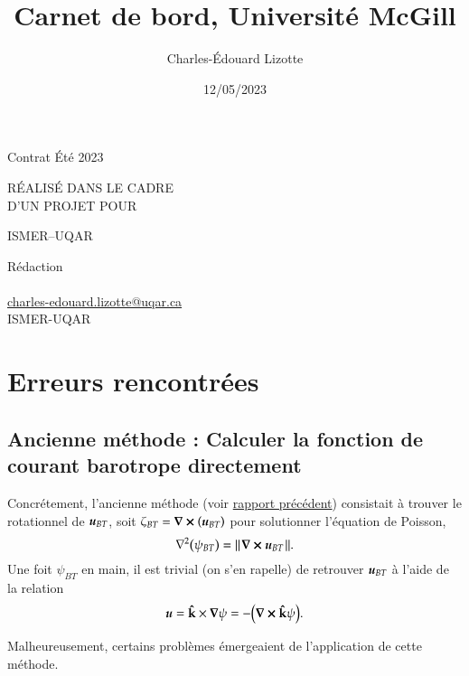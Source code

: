 \documentclass[10pt]{article}
\author{Charles-Édouard Lizotte}
\date{12/05/2023}
\title{Carnet de bord, Université McGill}
\makeatletter
\numberwithin{equation}{section}
\newcommand{\kvf}{\vb{\hat{k}}}
\newcommand{\uu}{\vb*{u}}
\newcommand{\pt}{\hspace{1pt}}
\newcommand{\mytitlepage}{
\begin{titlepage}
\begin{center}
{\Large Contrat Été 2023 \par}
\vspace{2cm}
{\Large \MakeUppercase{\thetitle} \par}
\vspace{2cm}
RÉALISÉ DANS LE CADRE\\ D'UN PROJET POUR \par
\vspace{2cm}
{\Large ISMER--UQAR \par}
\vspace{2cm}
{\thedate}
\end{center}
\vfill
Rédaction \\
{\theauthor}\\
\url{charles-edouard.lizotte@uqar.ca}\\
ISMER-UQAR
\end{titlepage}
}
\makeatother
\begin{document}
\mytitlepage
\tableofcontents\newpage

\section{Erreurs rencontrées}
\label{sec:org4651102}

\subsection{Ancienne méthode : Calculer la fonction de courant barotrope directement}
\label{sec:org2cc90f6}
Concrétement, l'ancienne méthode (voir \href{rapport-2023-04-28.org}{rapport précédent}) consistait à trouver le rotationnel de \(\uu_{BT}\), soit \(\zeta_{BT} = \curl(\uu_{BT})\) pour solutionner l'équation de Poisson,
\begin{equation}
\label{eq:orge3d6e94}
   \laplacian(\psi_{BT}) =  \norm{\pt\curl{\uu_{BT}}\pt}.
\end{equation}
Une foit \(\psi_{BT}\) en main, il est trivial (on s'en rapelle) de retrouver \(\uu_{BT}\) à l'aide de la relation
\begin{equation}
   \uu = \kvf\times\gradient{\psi} = - \qty(\curl{\kvf\psi}).
\end{equation}

Malheureusement, certains problèmes émergeaient de l'application de cette méthode.
\end{document}
